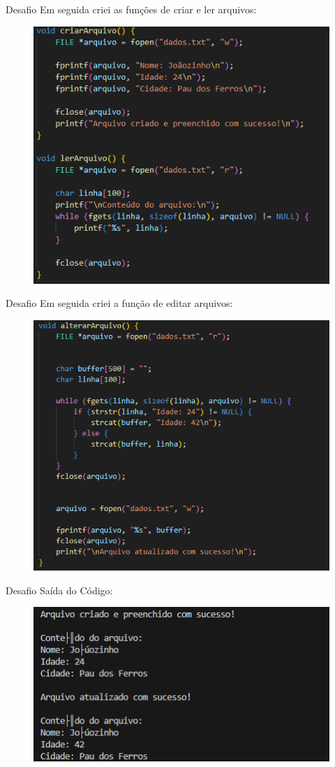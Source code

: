 \begin{frame}{Desafio}
Em seguida criei as funções de criar e ler arquivos:
\begin{figure}
    \centering
    \includegraphics[width=0.5\linewidth]{figuras/Cod2.png}
\end{figure}
\end{frame}

\begin{frame}{Desafio}
Em seguida criei a função de editar arquivos:
\begin{figure}
    \centering
    \includegraphics[width=0.5\linewidth]{figuras/Cod3.png}
\end{figure}
\end{frame}


\begin{frame}{Desafio}
Saída do Código:
\begin{figure}
    \centering
    \includegraphics[width=0.9\linewidth]{figuras/Cod4.png}
\end{figure}
\end{frame}


